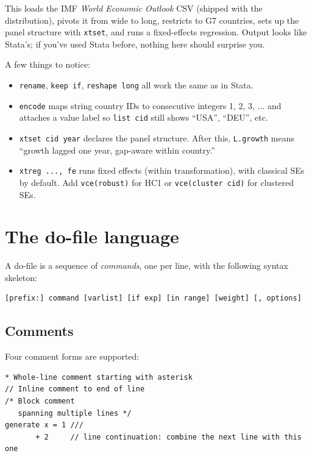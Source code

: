 \documentclass[11pt,letterpaper]{article}
\begin{document}
This loads the IMF \emph{World Economic Outlook} CSV (shipped with the
distribution), pivots it from wide to long, restricts to G7 countries,
sets up the panel structure with \texttt{xtset}, and runs a fixed-effects
regression.  Output looks like Stata's; if you've used Stata before,
nothing here should surprise you.

A few things to notice:

\begin{itemize}[leftmargin=*]
\item \texttt{rename}, \texttt{keep if}, \texttt{reshape long} all work
the same as in Stata.
\item \texttt{encode} maps string country IDs to consecutive integers
1, 2, 3, $\ldots$ and attaches a value label so \texttt{list cid} still
shows ``USA'', ``DEU'', etc.
\item \texttt{xtset cid year} declares the panel structure.  After this,
\texttt{L.growth} means ``growth lagged one year, gap-aware within
country.''
\item \texttt{xtreg ..., fe} runs fixed effects (within transformation),
with classical SEs by default.  Add \texttt{vce(robust)} for HC1 or
\texttt{vce(cluster cid)} for clustered SEs.
\end{itemize}

\section{The do-file language}

A do-file is a sequence of \emph{commands}, one per line, with the
following syntax skeleton:

\begin{lstlisting}
[prefix:] command [varlist] [if exp] [in range] [weight] [, options]
\end{lstlisting}

\subsection{Comments}

Four comment forms are supported:

\begin{lstlisting}
* Whole-line comment starting with asterisk
// Inline comment to end of line
/* Block comment
   spanning multiple lines */
generate x = 1 ///
       + 2     // line continuation: combine the next line with this one
\end{lstlisting}
\end{document}
